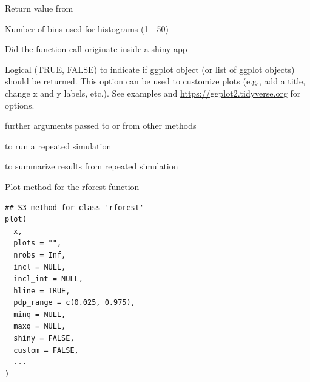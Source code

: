 \documentclass[a4paper]{book}
\begin{document}
%
\begin{Arguments}
\begin{ldescription}
\item[\code{x}] Return value from 

\item[\code{bins}] Number of bins used for histograms (1 - 50)

\item[\code{shiny}] Did the function call originate inside a shiny app

\item[\code{custom}] Logical (TRUE, FALSE) to indicate if ggplot object (or list of ggplot objects) should be returned. This option can be used to customize plots (e.g., add a title, change x and y labels, etc.). See examples and \url{https://ggplot2.tidyverse.org} for options.

\item[\code{...}] further arguments passed to or from other methods
\end{ldescription}
\end{Arguments}
%
\begin{SeeAlso}
 to run a repeated simulation

 to summarize results from repeated simulation
\end{SeeAlso}
%
\begin{Description}
Plot method for the rforest function
\end{Description}
%
\begin{Usage}
\begin{verbatim}
## S3 method for class 'rforest'
plot(
  x,
  plots = "",
  nrobs = Inf,
  incl = NULL,
  incl_int = NULL,
  hline = TRUE,
  pdp_range = c(0.025, 0.975),
  minq = NULL,
  maxq = NULL,
  shiny = FALSE,
  custom = FALSE,
  ...
)
\end{verbatim}
\end{Usage}
%
\end{document}
